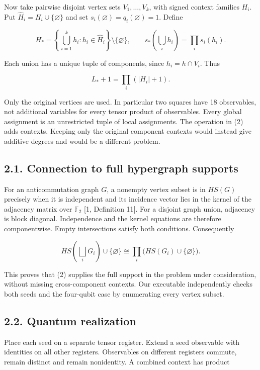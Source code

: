 \documentclass[10pt,a4paper]{article}
\begin{document}
Now take pairwise disjoint vertex sets \(V_1,\ldots,V_k\), with signed context families \(H_i\). Put \(\widehat H_i=H_i\cup\{\varnothing\}\) and set \(s_i(\varnothing)=q_i(\varnothing)=1\). Define

\[H_* = \left\{\bigcup_{i=1}^k h_i:
h_i\in\widehat H_i\right\}\setminus\{\varnothing\},
\qquad s_*\!\left(\bigcup_i h_i\right)=\prod_i s_i(h_i). \tag{2}\]

Each union has a unique tuple of components, since \(h_i=h\cap V_i\). Thus

\[L_*+1=\prod_i(|H_i|+1). \tag{3}\]

Only the original vertices are used. In particular two squares have 18 observables, not additional variables for every tensor product of observables. Every global assignment is an unrestricted tuple of local assignments. The operation in (2) adds contexts. Keeping only the original component contexts would instead give additive degrees and would be a different problem.

\subsection{2.1. Connection to full hypergraph supports}\label{connection-to-full-hypergraph-supports}

For an anticommutation graph \(G\), a nonempty vertex subset is in \(HS(G)\) precisely when it is independent and its incidence vector lies in the kernel of the adjacency matrix over \(\mathbb F_2\) {[}1, Definition 11{]}. For a disjoint graph union, adjacency is block diagonal. Independence and the kernel equations are therefore componentwise. Empty intersections satisfy both conditions. Consequently

\[HS\!\left(\bigsqcup_iG_i\right)\cup\{\varnothing\}
\cong\prod_i\bigl(HS(G_i)\cup\{\varnothing\}\bigr). \tag{4}\]

This proves that (2) supplies the full support in the problem under consideration, without missing cross-component contexts. Our executable independently checks both seeds and the four-qubit case by enumerating every vertex subset.

\subsection{2.2. Quantum realization}\label{quantum-realization}

Place each seed on a separate tensor register. Extend a seed observable with identities on all other registers. Observables on different registers commute, remain distinct and remain nonidentity. A combined context has product
\end{document}
